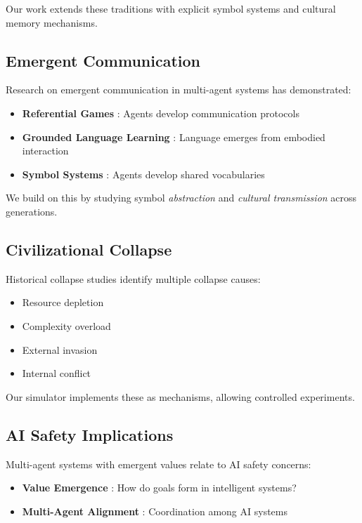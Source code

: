 \documentclass[11pt,a4paper]{article}
\begin{document}
Our work extends these traditions with explicit symbol systems and cultural memory mechanisms.

\subsection{Emergent Communication}

Research on emergent communication in multi-agent systems has demonstrated:

\begin{itemize}
    \item \textbf{Referential Games} \cite{lazaridou2016}: Agents develop communication protocols
    \item \textbf{Grounded Language Learning} \cite{hermann2017}: Language emerges from embodied interaction
    \item \textbf{Symbol Systems} \cite{bouchacourt2018}: Agents develop shared vocabularies
\end{itemize}

We build on this by studying symbol \textit{abstraction} and \textit{cultural transmission} across generations.

\subsection{Civilizational Collapse}

Historical collapse studies \cite{tainter1988,diamond2005} identify multiple collapse causes:

\begin{itemize}
    \item Resource depletion
    \item Complexity overload
    \item External invasion
    \item Internal conflict
\end{itemize}

Our simulator implements these as mechanisms, allowing controlled experiments.

\subsection{AI Safety Implications}

Multi-agent systems with emergent values relate to AI safety concerns:

\begin{itemize}
    \item \textbf{Value Emergence} \cite{bostrom2014}: How do goals form in intelligent systems?
    \item \textbf{Multi-Agent Alignment} \cite{dafoe2020}: Coordination among AI systems
\end{itemize}
\end{document}
